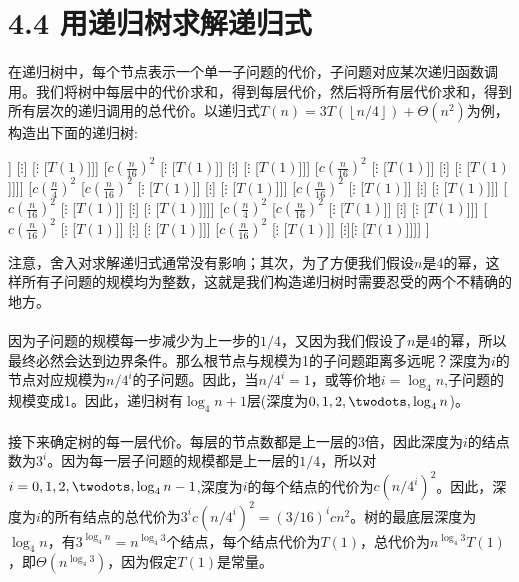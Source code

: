 \documentclass[a4paper,11pt]{article}
\newcommand{\floor}[1]{\left\lfloor #1 \right\rfloor}
\begin{document}
\section*{4.4 用递归树求解递归式}
\paragraph*{}在递归树中，每个节点表示一个单一子问题的代价，子问题对应某次递归函数调用。我们将树中每层中的代价求和，得到每层代价，然后将所有层代价求和，得到所有层次的递归调用的总代价。以递归式$T(n)=3T(\floor{n/4})+\Theta(n^2)$为例，构造出下面的递归树:\\
{\footnotesize
\begin{forest}
	[$cn^2$
		[$c(\frac{n}{4})^2$ [$c(\frac{n}{16})^2$ [$\vdots$ [$T(1)$]] [$\vdots$] [$\vdots$ [$T(1)$]]] [$c(\frac{n}{16})^2$ [$\vdots$ [$T(1)$]] [$\vdots$] [$\vdots$ [$T(1)$]]] [$c(\frac{n}{16})^2$ [$\vdots$ [$T(1)$]] [$\vdots$] [$\vdots$ [$T(1)$]]]]
		[$c(\frac{n}{4})^2$ [$c(\frac{n}{16})^2$ [$\vdots$ [$T(1)$]] [$\vdots$] [$\vdots$ [$T(1)$]]] [$c(\frac{n}{16})^2$ [$\vdots$ [$T(1)$]] [$\vdots$] [$\vdots$ [$T(1)$]]] [$c(\frac{n}{16})^2$ [$\vdots$ [$T(1)$]] [$\vdots$] [$\vdots$ [$T(1)$]]]]
		[$c(\frac{n}{4})^2$ [$c(\frac{n}{16})^2$ [$\vdots$ [$T(1)$]] [$\vdots$] [$\vdots$ [$T(1)$]]] [$c(\frac{n}{16})^2$ [$\vdots$ [$T(1)$]] [$\vdots$] [$\vdots$ [$T(1)$]]] [$c(\frac{n}{16})^2$ [$\vdots$ [$T(1)$]] [$\vdots$][$\vdots$ [$T(1)$]]]]
	]
\end{forest}%
}
注意，舍入对求解递归式通常没有影响；其次，为了方便我们假设$n$是4的幂，这样所有子问题的规模均为整数，这就是我们构造递归树时需要忍受的两个不精确的地方。
\paragraph*{}因为子问题的规模每一步减少为上一步的$1/4$，又因为我们假设了$n$是4的幂，所以最终必然会达到边界条件。那么根节点与规模为1的子问题距离多远呢？深度为$i$的节点对应规模为$n/4^i$的子问题。因此，当$n/4^i=1$，或等价地$i=\log_{4}{n}$,子问题的规模变成1。因此，递归树有$\log_{4}{n}+1$层(深度为$0,1,2,\twodots,\log_{4}{n}$)。
\paragraph*{}接下来确定树的每一层代价。每层的节点数都是上一层的3倍，因此深度为$i$的结点数为$3^i$。因为每一层子问题的规模都是上一层的$1/4$，所以对$i=0,1,2,\twodots,\log_{4}{n}-1$,深度为$i$的每个结点的代价为$c(n/4^i)^2$。因此，深度为$i$的所有结点的总代价为$3^ic(n/4^i)^2=(3/16)^icn^2$。树的最底层深度为$\log_{4}{n}$，有$3^{\log_{4}{n}}=n^{\log_{4}{3}}$个结点，每个结点代价为$T(1)$，总代价为$n^{\log_{4}{3}}T(1)$，即$\Theta(n^{\log_{4}{3}})$，因为假定$T(1)$是常量。
\end{document}

